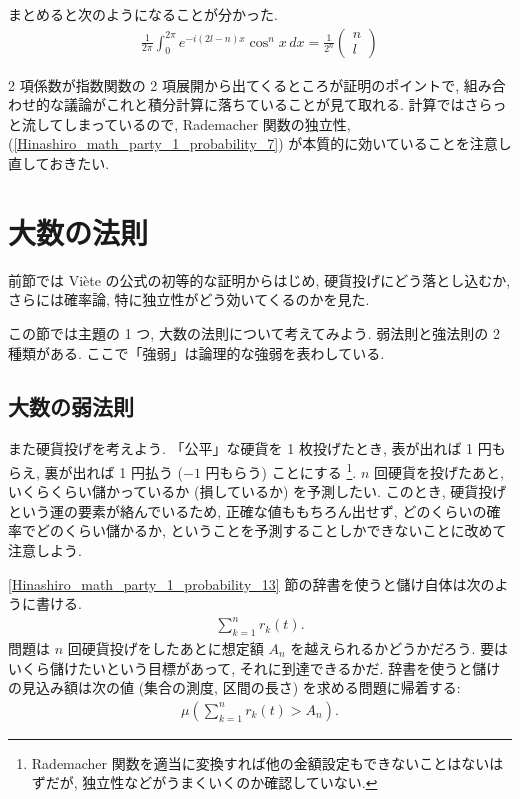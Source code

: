 \documentclass[openany, a4paper, oneside]{book}
\theoremstyle{break}
\theoremstyle{breakdefn}
\newcommand{\rbk}[1]{\left (#1\right)}
\begin{document}
まとめると次のようになることが分かった.
\begin{align}
 \frac{1}{2 \pi} \int_0^{2 \pi} e^{-i (2l -n) x} \cos^n x \, dx
 =
 \frac{1}{2^n}
 \begin{pmatrix}
  n \\
  l
 \end{pmatrix} \label{Hinashiro_math_party_1_probability_9}
\end{align}

2 項係数が指数関数の 2 項展開から出てくるところが証明のポイントで,
組み合わせ的な議論がこれと積分計算に落ちていることが見て取れる.
計算ではさらっと流してしまっているので,
Rademacher 関数の独立性, (\ref{Hinashiro_math_party_1_probability_7}) が本質的に効いていることを注意し直しておきたい.
\section{大数の法則}
\label{sec-8-1-5}

前節では Vi\`ete の公式の初等的な証明からはじめ, 硬貨投げにどう落とし込むか,
さらには確率論, 特に独立性がどう効いてくるのかを見た.

この節では主題の 1 つ, 大数の法則について考えてみよう.
弱法則と強法則の 2 種類がある.
ここで「強弱」は論理的な強弱を表わしている.
\subsection{大数の弱法則}
\label{sec-8-1-5-1}

また硬貨投げを考えよう.
「公平」な硬貨を 1 枚投げたとき, 表が出れば 1 円もらえ, 裏が出れば 1 円払う ($-1$ 円もらう) ことにする \footnote{Rademacher 関数を適当に変換すれば他の金額設定もできないことはないはずだが, 独立性などがうまくいくのか確認していない.
 }.
$n$ 回硬貨を投げたあと, いくらくらい儲かっているか (損しているか) を予測したい.
このとき, 硬貨投げという運の要素が絡んでいるため, 正確な値ももちろん出せず,
どのくらいの確率でどのくらい儲かるか, ということを予測することしかできないことに改めて注意しよう.

\ref{Hinashiro_math_party_1_probability_13} 節の辞書を使うと儲け自体は次のように書ける.
\begin{align}
 \sum_{k=1}^n r_k (t).
\end{align}
問題は $n$ 回硬貨投げをしたあとに想定額 $A_n$ を越えられるかどうかだろう.
要はいくら儲けたいという目標があって, それに到達できるかだ.
辞書を使うと儲けの見込み額は次の値 (集合の測度, 区間の長さ) を求める問題に帰着する:
\begin{align}
 \mu \rbk{\sum_{k=1}^n r_k (t) > A_n}. \label{Hinashiro_math_party_1_probability_20}
\end{align}
\end{document}
